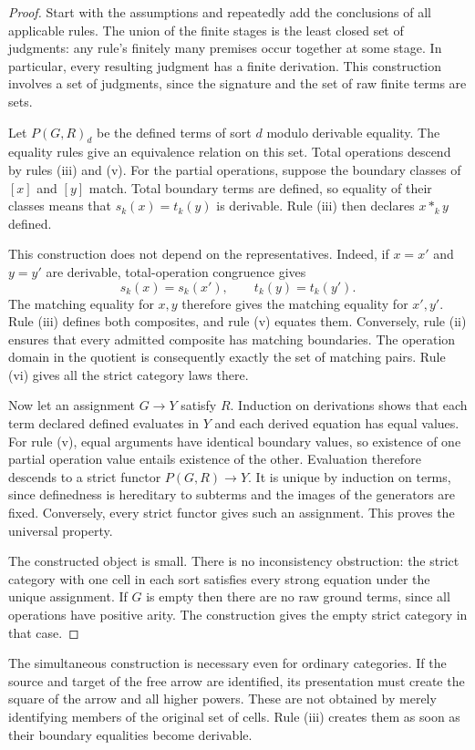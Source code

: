 \begin{proof}
Start with the assumptions and repeatedly add the conclusions of
all applicable rules. The union of the finite stages is the least
closed set of judgments: any rule's finitely many premises occur
together at some stage. In particular, every resulting judgment
has a finite derivation. This construction involves a set of
judgments, since the signature and the set of raw finite terms
are sets.

Let $P(G,R)_d$ be the defined terms of sort $d$ modulo derivable
equality. The equality rules give an equivalence relation on this
set. Total operations descend by rules (iii) and (v). For the
partial operations, suppose the boundary classes of $[x]$ and
$[y]$ match. Total boundary terms are defined, so equality of
their classes means that $s_k(x)=t_k(y)$ is derivable. Rule (iii)
then declares $x*_k y$ defined.

This construction does not depend on the representatives. Indeed,
if $x=x'$ and $y=y'$ are derivable, total-operation congruence gives
\[
 s_k(x)=s_k(x'),\qquad t_k(y)=t_k(y').
\]
The matching equality for $x,y$ therefore gives the matching
equality for $x',y'$. Rule (iii) defines both composites, and
rule (v) equates them. Conversely, rule (ii) ensures that every
admitted composite has matching boundaries. The operation domain
in the quotient is consequently exactly the set of matching
pairs. Rule (vi) gives all the strict category laws there.

Now let an assignment $G\to Y$ satisfy $R$. Induction on derivations
shows that each term declared defined evaluates in $Y$ and each
derived equation has equal values. For rule (v), equal arguments
have identical boundary values, so existence of one partial
operation value entails existence of the other. Evaluation
therefore descends to a strict functor $P(G,R)\to Y$.
It is unique by induction on terms, since definedness is hereditary
to subterms and the images of the generators are fixed. Conversely,
every strict functor gives such an assignment. This proves the
universal property.

The constructed object is small. There is no inconsistency
obstruction: the strict category with one cell in each sort
satisfies every strong equation under the unique assignment.
If $G$ is empty then there are no raw ground terms, since all
operations have positive arity. The construction gives the empty
strict category in that case.
\end{proof}

\begin{remark}\label{rem:presentations-create-composites}
The simultaneous construction is necessary even for ordinary
categories. If the source and target of the free arrow are
identified, its presentation must create the square of the arrow
and all higher powers. These are not obtained by merely identifying
members of the original set of cells. Rule (iii) creates them as
soon as their boundary equalities become derivable.
\end{remark}


